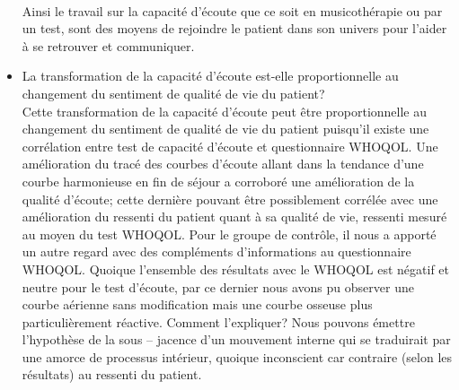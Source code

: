 \begin{itemize}
  	 \\	
  Ainsi le travail sur la capacité d'écoute que ce soit en musicothérapie ou par un test, sont des moyens 
  de rejoindre le patient dans son univers pour l'aider à se retrouver et  communiquer.
 	\item La transformation de la capacité d'écoute est-elle  proportionnelle au changement 
 	du sentiment de qualité de vie du patient?
 	\\
   Cette transformation de la capacité d'écoute peut être proportionnelle au changement du sentiment de 
   qualité de vie du patient puisqu'il existe une corrélation entre test de capacité d'écoute et questionnaire 
   WHOQOL. Une amélioration du tracé des courbes d'écoute allant dans la tendance d'une courbe 
   harmonieuse en 
   fin de séjour a corroboré une amélioration de la qualité d'écoute; cette dernière pouvant être 
   possiblement corrélée avec une amélioration du ressenti du patient quant à sa qualité de vie, ressenti 
   mesuré au moyen du test WHOQOL.
 \newline 
     Pour le groupe de contrôle, il nous a
 apporté un autre regard avec des compléments d'informations au 
 questionnaire
 WHOQOL. Quoique l'ensemble des résultats avec le WHOQOL est
 négatif et neutre pour le
 test d'écoute, par ce dernier nous avons pu observer une 
 courbe 
 aérienne
 sans modification mais une courbe osseuse plus
 particulièrement réactive. Comment l'expliquer?
 Nous pouvons émettre l'hypothèse de   %
 la sous -- jacence 
 d'un mouvement interne qui se traduirait par 
 une amorce de
 processus intérieur,  quoique inconscient car contraire (selon les résultats) au ressenti du patient.
  
  
  

\end{itemize}
